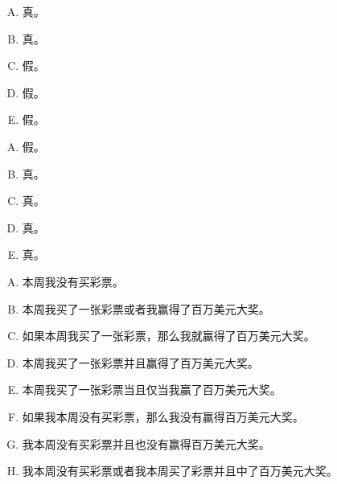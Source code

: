 {{        %
        \begin{practices}
            \begin{enumerate}[A.]
                \item 真。
                \item 真。
                \item 假。
                \item 假。
                \item 假。
            \end{enumerate}
        \end{practices}

        \begin{practices}
            \begin{enumerate}[A.]
                \item 假。
                \item 真。
                \item 真。
                \item 真。
                \item 真。
            \end{enumerate}
        \end{practices}

        \begin{practices}
            \begin{enumerate}[A.]
                \item 本周我没有买彩票。
                \item 本周我买了一张彩票或者我赢得了百万美元大奖。
                \item 如果本周我买了一张彩票，那么我就赢得了百万美元大奖。
                \item 本周我买了一张彩票并且赢得了百万美元大奖。
                \item 本周我买了一张彩票当且仅当我赢了百万美元大奖。
                \item 如果我本周没有买彩票，那么我没有赢得百万美元大奖。
                \item 我本周没有买彩票并且也没有赢得百万美元大奖。
                \item 我本周没有买彩票或者我本周买了彩票并且中了百万美元大奖。
            \end{enumerate}
        \end{practices}

}}
